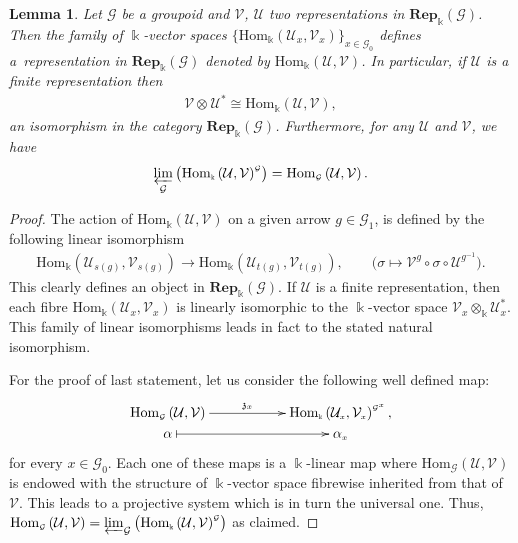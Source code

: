 \documentclass[11pt]{article}
\numberwithin{equation}{section}
\newtheorem{Lemma}[Theorem]{Lemma}
\newcommand{\tensor}[1]{\otimes_{\scriptscriptstyle{#1}}}
\newcommand{\fk}[1]{\mathfrak{#1}}
\renewcommand{\hom}[3]{\mathrm{Hom}_{\Sscript{#1}}\left(#2, #3\right)}
\newcommand{\Rep}[1]{\mathbf{Rep}_{\Sscript{\Bbbk}}(#1)}
\newcommand{\Go}{\cG_{\Sscript{0}}}
\newcommand{\Ga}{\cG_{\Sscript{1}}}
\newcommand{\Vx}{\cV_{\Sscript{x}}}
\newcommand{\Ux}{\cU_{\Sscript{x}}}
\newcommand{\Vg}{\cV^{\Sscript{g}}}
\newcommand{\Umg}{\cU^{\Sscript{g}^{-1}}}
\newcommand{\cG}{{\mathcal G}}
\newcommand{\cU}{{\mathcal U}}
\newcommand{\cV}{{\mathcal V}}
\newcommand{\Sscript}[1]{\scriptscriptstyle{#1}}
\newcommand{\prolimit}[2]{\varprojlim_{#1}\left({#2}\right)}
\begin{document}
\begin{Lemma}\label{lema:Hom}Let $\cG$ be a groupoid and $\cV$, $\cU$ two representations in $\Rep{\cG}$. Then the fa\-mily of $\Bbbk$-vector spaces $\big\{\hom{\Bbbk}{\Ux}{\Vx}\big\}_{x \in \Go }$ defines a~representation in $\Rep{\cG}$ denoted by $\hom{\Bbbk}{\cU}{\cV}$. In particular, if $\cU$ is a finite representation then
\begin{gather*}
\cV \tensor{} \cU^{*} \cong \hom{\Bbbk}{\cU}{\cV},
\end{gather*}
an isomorphism in the category $\Rep{\cG}$. Furthermore, for any $\cU$ and $\cV$, we have
\begin{gather*}
\prolimit{\cG}{\hom{\Bbbk}{\cU}{\cV}^{\Sscript{\cG}}} =\hom{\cG}{\cU}{\cV}.
\end{gather*}
\end{Lemma}
\begin{proof}The action of $\hom{\Bbbk}{\cU}{\cV}$ on a given arrow $g \in \Ga$, is defined by the following linear isomorphism
\begin{gather*}
\hom{\Bbbk}{\cU_{\Sscript{s(g)}}}{\cV_{\Sscript{s(g)}}}\longrightarrow \hom{\Bbbk}{\cU_{\Sscript{t(g)}}}{\cV_{\Sscript{t(g)}}}, \qquad \big( \sigma \longmapsto \Vg \circ \sigma \circ \Umg \big).
\end{gather*}
This clearly defines an object in $\Rep{\cG}$. If $\cU$ is a finite representation, then each fibre $\hom{\Bbbk}{\Ux}{\Vx}$ is linearly isomorphic to the $\Bbbk$-vector space $\Vx\tensor{\Bbbk}\Ux^*$. This family of linear isomorphisms leads in fact to the stated natural isomorphism.

For the proof of last statement, let us consider the following well defined map:
\begin{gather*}
\xymatrix@R=0pt{ \hom{\cG}{\cU}{\cV} \ar@{->}^-{\fk{z}_{\Sscript{x}} }[rr] & & \hom{\Bbbk}{\Ux}{\Vx}^{\Sscript{\cG^x}}, \\ \alpha \ar@{|->}^-{}[rr]
& & \alpha_{\Sscript{x}} }
\end{gather*}
for every $x \in \Go$. Each one of these maps is a $\Bbbk$-linear map where $\hom{\cG}{\cU}{\cV}$ is endowed with the structure of $\Bbbk$-vector space fibrewise inherited from that of $\cV$. This leads to a projective system which is in turn the universal one. Thus, $\hom{\cG}{\cU}{\cV}=\prolimit{\cG}{\hom{\Bbbk}{\cU}{\cV}^{\Sscript{\cG}}}$ as claimed.
\end{proof}
\end{document}
